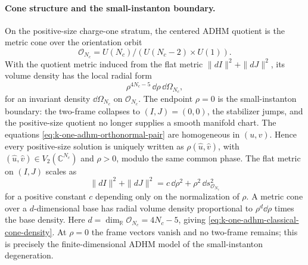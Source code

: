 \paragraph{Cone structure and the small-instanton boundary.}
On the positive-size charge-one stratum, the centered ADHM quotient is the
metric cone over the orientation orbit
\[
  \mathcal O_{N_c}
  =
  U(N_c)/(U(N_c-2)\times U(1)).
\]
With the quotient metric induced from the flat metric
\(\|dI\|^2+\|dJ\|^2\), its volume density has the local radial form
\begin{equation}
  \rho^{4N_c-5}\,\dd\rho\,\dd\Omega_{N_c},
  \label{eq:k-one-adhm-classical-cone-density}
\end{equation}
for an invariant density \(\dd\Omega_{N_c}\) on \(\mathcal O_{N_c}\).  The
endpoint \(\rho=0\) is the small-instanton boundary: the two-frame collapses
to \((I,J)=(0,0)\), the stabilizer jumps, and the positive-size quotient no
longer supplies a smooth manifold chart.
The equations \eqref{eq:k-one-adhm-orthonormal-pair} are homogeneous in
\((u,v)\).  Hence every positive-size solution is uniquely written as
\(\rho(\hat u,\hat v)\), with \((\hat u,\hat v)\in V_2(\mathbb C^{N_c})\)
and \(\rho>0\), modulo the same common phase.  The flat metric on
\((I,J)\) scales as
\[
  \|dI\|^2+\|dJ\|^2
  =
  c\,\dd\rho^2+\rho^2\,\dd s^2_{\mathcal O_{N_c}}
\]
for a positive constant \(c\) depending only on the normalization of
\(\rho\).  A metric cone over a \(d\)-dimensional base has radial volume
density proportional to \(\rho^d\dd\rho\) times the base density.  Here
\(d=\dim_\mathbb R\mathcal O_{N_c}=4N_c-5\), giving
\eqref{eq:k-one-adhm-classical-cone-density}.  At \(\rho=0\) the frame
vectors vanish and no two-frame remains; this is precisely the
finite-dimensional ADHM model of the small-instanton degeneration.

